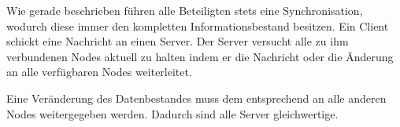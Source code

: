 Wie gerade beschrieben führen alle Beteiligten stets eine Synchronisation, wodurch diese immer den kompletten Informationsbestand besitzen. Ein Client schickt eine Nachricht an einen Server. Der Server versucht alle zu ihm verbundenen Nodes aktuell zu halten indem er die Nachricht oder die Änderung an alle verfügbaren Nodes weiterleitet.

Eine Veränderung des Datenbestandes muss dem entsprechend an alle anderen Nodes weitergegeben werden.
Dadurch sind alle Server gleichwertige.
